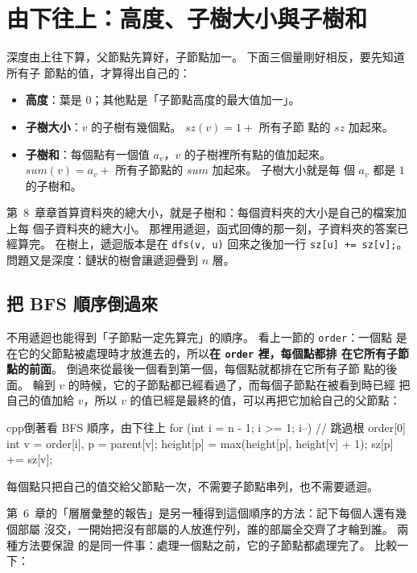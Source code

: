\section{由下往上：高度、子樹大小與子樹和}
\label{sec:tree-bottom-up}

深度由上往下算，父節點先算好，子節點加一。 下面三個量剛好相反，要先知道所有子
節點的值，才算得出自己的：

\begin{itemize}
\item \textbf{高度}：葉是 $0$；其他點是「子節點高度的最大值加一」。
\item \textbf{子樹大小}：$v$ 的子樹有幾個點。 $\mathit{sz}(v) = 1 +$ 所有子節
點的 $\mathit{sz}$ 加起來。
\item \textbf{子樹和}：每個點有一個值 $a_v$，$v$ 的子樹裡所有點的值加起來。
$\mathit{sum}(v) = a_v +$ 所有子節點的 $\mathit{sum}$ 加起來。 子樹大小就是每
個 $a_v$ 都是 $1$ 的子樹和。
\end{itemize}

第~8~章章首算資料夾的總大小，就是子樹和：每個資料夾的大小是自己的檔案加上每
個子資料夾的總大小。 那裡用遞迴，函式回傳的那一刻，子資料夾的答案已經算完。
在樹上，遞迴版本是在 \texttt{dfs(v, u)} 回來之後加一行
\texttt{sz[u] += sz[v];}。 問題又是深度：鏈狀的樹會讓遞迴疊到 $n$ 層。

\subsection{把 BFS 順序倒過來}

不用遞迴也能得到「子節點一定先算完」的順序。 看上一節的 \texttt{order}：一個點
是在它的父節點被處理時才放進去的，所以\textbf{在 \texttt{order} 裡，每個點都排
在它所有子節點的前面}。 倒過來從最後一個看到第一個，每個點就都排在它所有子節
點的後面。 輪到 $v$ 的時候，它的子節點都已經看過了，而每個子節點在被看到時已經
把自己的值加給 $v$，所以 $v$ 的值已經是最終的值，可以再把它加給自己的父節點：

\begin{code}{cpp}{倒著看 BFS 順序，由下往上}
for (int i = n - 1; i >= 1; i--) {      // 跳過根 order[0]
    int v = order[i], p = parent[v];
    height[p] = max(height[p], height[v] + 1);
    sz[p] += sz[v];
}
\end{code}

每個點只把自己的值交給父節點一次，不需要子節點串列，也不需要遞迴。

第~6~章的「層層彙整的報告」是另一種得到這個順序的方法：記下每個人還有幾個部屬
沒交，一開始把沒有部屬的人放進佇列，誰的部屬全交齊了才輪到誰。 兩種方法要保證
的是同一件事：處理一個點之前，它的子節點都處理完了。 比較一下：

